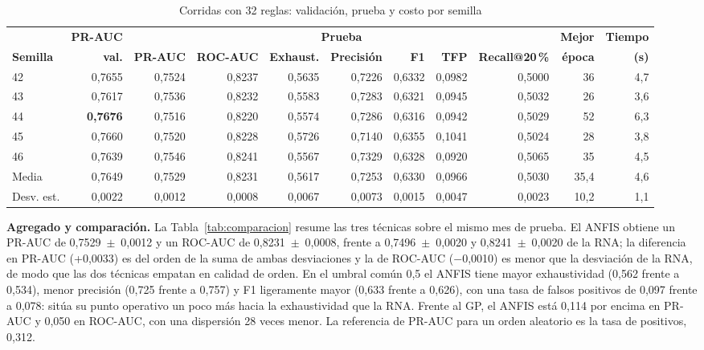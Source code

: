 \documentclass[conference]{IEEEtran}
\begin{document}
\begin{table}[htbp]
\caption{Corridas con 32 reglas: validación, prueba y costo por semilla}
\label{tab:semillas}
\centering
\footnotesize
\setlength{\tabcolsep}{5pt}
\begin{tabular}{lrrrrrrrrrr}
\toprule
& \textbf{PR-AUC} & \multicolumn{7}{c}{\textbf{Prueba}} & \textbf{Mejor} & \textbf{Tiempo}\\
\cmidrule(lr){3-9}
\textbf{Semilla} & \textbf{val.} & \textbf{PR-AUC} & \textbf{ROC-AUC} & \textbf{Exhaust.} & \textbf{Precisión} & \textbf{F1} & \textbf{TFP} & \textbf{Recall@20\,\%} & \textbf{época} & \textbf{(s)}\\
\midrule
42 & 0,7655 & 0,7524 & 0,8237 & 0,5635 & 0,7226 & 0,6332 & 0,0982 & 0,5000 & 36 & 4,7\\
43 & 0,7617 & 0,7536 & 0,8232 & 0,5583 & 0,7283 & 0,6321 & 0,0945 & 0,5032 & 26 & 3,6\\
44 & \textbf{0,7676} & 0,7516 & 0,8220 & 0,5574 & 0,7286 & 0,6316 & 0,0942 & 0,5029 & 52 & 6,3\\
45 & 0,7660 & 0,7520 & 0,8228 & 0,5726 & 0,7140 & 0,6355 & 0,1041 & 0,5024 & 28 & 3,8\\
46 & 0,7639 & 0,7546 & 0,8241 & 0,5567 & 0,7329 & 0,6328 & 0,0920 & 0,5065 & 35 & 4,5\\
\midrule
Media & 0,7649 & 0,7529 & 0,8231 & 0,5617 & 0,7253 & 0,6330 & 0,0966 & 0,5030 & 35,4 & 4,6\\
Desv. est. & 0,0022 & 0,0012 & 0,0008 & 0,0067 & 0,0073 & 0,0015 & 0,0047 & 0,0023 & 10,2 & 1,1\\
\bottomrule
\end{tabular}
\end{table}

\textbf{Agregado y comparación.} La Tabla~\ref{tab:comparacion} resume las
tres técnicas sobre el mismo mes de prueba. El ANFIS obtiene un PR-AUC de
0,7529~$\pm$~0,0012 y un ROC-AUC de 0,8231~$\pm$~0,0008, frente a
0,7496~$\pm$~0,0020 y 0,8241~$\pm$~0,0020 de la RNA; la diferencia en PR-AUC
(+0,0033) es del orden de la suma de ambas desviaciones y la de ROC-AUC
($-$0,0010) es menor que la desviación de la RNA, de modo que las dos
técnicas empatan en calidad de orden. En el umbral común 0,5 el ANFIS tiene
mayor exhaustividad (0,562 frente a 0,534), menor precisión (0,725 frente a
0,757) y F1 ligeramente mayor (0,633 frente a 0,626), con una tasa de falsos
positivos de 0,097 frente a 0,078: sitúa su punto operativo un poco más
hacia la exhaustividad que la RNA. Frente al GP, el ANFIS está 0,114 por
encima en PR-AUC y 0,050 en ROC-AUC, con una dispersión 28 veces menor. La
referencia de PR-AUC para un orden aleatorio es la tasa de positivos, 0,312.
\end{document}

